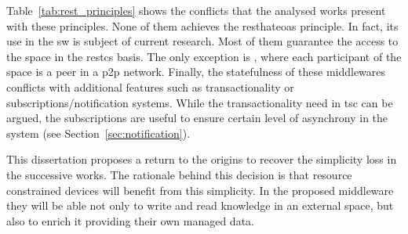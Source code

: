 Table~\ref{tab:rest_principles} shows the conflicts that the analysed works present with these principles.
None of them achieves the \ac{resthateoas} principle.
In fact, its use in the \ac{sw} is subject of current research.
Most of them guarantee the access to the space in the \ac{restcs} basis.
The only exception is \midtscpp{}, where each participant of the space is a peer in a \ac{p2p} network.
Finally, the statefulness of these middlewares conflicts with additional features such as transactionality or subscriptions/notification systems.
While the transactionality need in \ac{tsc} can be argued,
the subscriptions are useful to ensure certain level of asynchrony in the system (see Section~\ref{sec:notification}).





This dissertation proposes a return to the origins to recover the simplicity loss in the successive works.
The rationale behind this decision is that resource constrained devices will benefit from this simplicity.
In the proposed middleware they will be able not only to write and read knowledge in an external space, but also to enrich it providing their own managed data.
